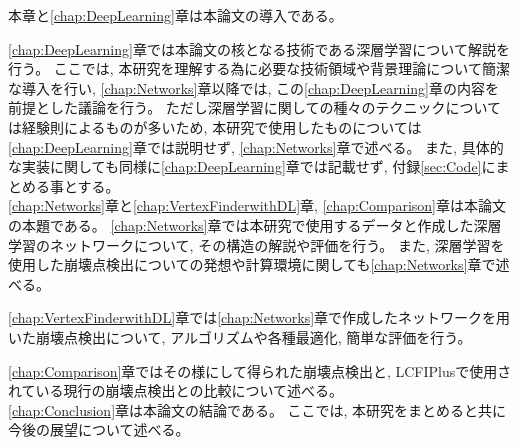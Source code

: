 本章と\ref{chap:DeepLearning}章は本論文の導入である。

\ref{chap:DeepLearning}章では本論文の核となる技術である深層学習について解説を行う。
ここでは, 本研究を理解する為に必要な技術領域や背景理論について簡潔な導入を行い, \ref{chap:Networks}章以降では, この\ref{chap:DeepLearning}章の内容を前提とした議論を行う。
ただし深層学習に関しての種々のテクニックについては経験則によるものが多いため, 本研究で使用したものについては\ref{chap:DeepLearning}章では説明せず, \ref{chap:Networks}章で述べる。
また, 具体的な実装に関しても同様に\ref{chap:DeepLearning}章では記載せず, 付録\ref{sec:Code}にまとめる事とする。\\

\ref{chap:Networks}章と\ref{chap:VertexFinderwithDL}章, \ref{chap:Comparison}章は本論文の本題である。
\ref{chap:Networks}章では本研究で使用するデータと作成した深層学習のネットワークについて, その構造の解説や評価を行う。
また, 深層学習を使用した崩壊点検出についての発想や計算環境に関しても\ref{chap:Networks}章で述べる。

\ref{chap:VertexFinderwithDL}章では\ref{chap:Networks}章で作成したネットワークを用いた崩壊点検出について, アルゴリズムや各種最適化, 簡単な評価を行う。

\ref{chap:Comparison}章ではその様にして得られた崩壊点検出と, LCFIPlusで使用されている現行の崩壊点検出との比較について述べる。\\

\ref{chap:Conclusion}章は本論文の結論である。
ここでは, 本研究をまとめると共に今後の展望について述べる。

















